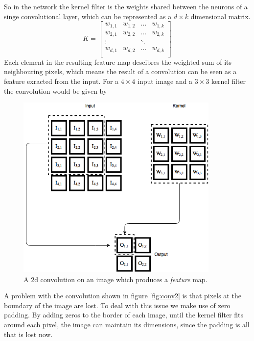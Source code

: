 \documentclass[11pt]{article}
\begin{document}
So in the network the kernel filter is the weights shared between the neurons of a
singe convolutional layer, which can be represented as a $d \times k$ dimensional matrix.
$$
K =
\begin{bmatrix}
    w_{1,1 } & w_{1, 2} & \hdots & w_{1, k} \\
    w_{2,1 } & w_{2, 2} & \hdots & w_{2, k} \\
    \vdots   &          & \ddots &          \\
    w_{d,1 } & w_{d, 2} & \hdots & w_{d, k} \\
\end{bmatrix}
$$
Each element in the resulting feature map descibres the weighted sum of its neighbouring
pixels, which means the result of a convolution can be seen as a feature exracted from
the input.
For a $4 \times 4$ input image and a $3 \times 3$ kernel filter the convolution
would be given by
\begin{figure}[!h]\label{conv2}
    \centering
    \includegraphics[width=10cm]{include/conv_2.png}
    \caption{A 2d convolution on an image which produces a \textit{feature} map.}
    \label{fig:conv}
\end{figure}
\newpage
A problem with the convolution shown in figure \ref{fig:conv2} is that
pixels at the boundary of the image are lost.
To deal with this issue we make use of zero padding.
By adding zeros to the border of each image, until the kernel
filter fits around each pixel, the image can maintain its dimensions, since the
padding is all that is lost now.
\end{document}
